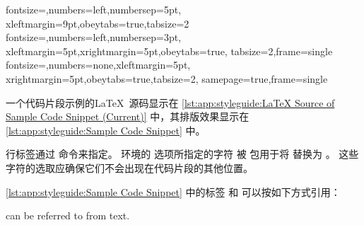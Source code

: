 \begin{VerbatimU}
%
  {fontsize=\scriptsize,numbers=left,numbersep=5pt,%
    xleftmargin=9pt,obeytabs=true,tabsize=2}
%
  {fontsize=\scriptsize,numbers=left,numbersep=3pt,%
    xleftmargin=5pt,xrightmargin=5pt,obeytabs=true,%
    tabsize=2,frame=single}
%
  {fontsize=\scriptsize,numbers=none,xleftmargin=5pt,%
    xrightmargin=5pt,obeytabs=true,tabsize=2,%
    samepage=true,frame=single}
\end{VerbatimU}


\begin{listing}
\begin{fcvlabel}
\end{fcvlabel}
\vspace*{-9pt}
\caption{示例代码片段的 \LaTeX\ 源码（当前方案）}
\label{lst:app:styleguide:LaTeX Source of Sample Code Snippet (Current)}
\end{listing}



一个代码片段示例的\LaTeX\ 源码显示在
\cref{lst:app:styleguide:LaTeX Source of Sample Code Snippet (Current)}
中，其排版效果显示在
\cref{lst:app:styleguide:Sample Code Snippet} 中。

行标签通过  命令来指定。
 环境的  选项所指定的字符
被  包用于将  替换为
\qco{\\lnlbl\{\}}。
这些字符的选取应确保它们不会出现在代码片段的其他位置。

\cref{lst:app:styleguide:Sample Code Snippet} 中的标签
 和 
可以按如下方式引用：

\begin{VerbatimU}
\begin{fcvref}[ln:base1]
 can be referred
to from text.
\end{fcvref}
\end{VerbatimU}

